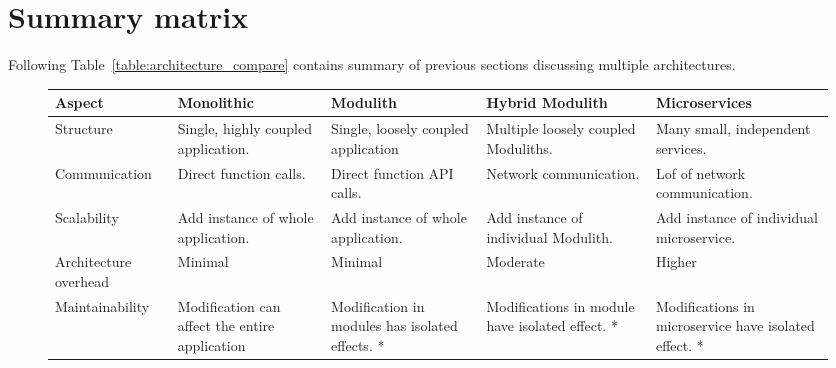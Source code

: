 \section{Summary matrix}
Following Table~\ref{table:architecture_compare} contains summary of previous sections discussing multiple architectures.


\begin{sidewaysfigure}
    \begin{tabular}{ |p{2.7cm}|p{3cm}|p{3cm}|p{4cm}|p{3cm}| }
        \hline
        \textbf{Aspect}       & \textbf{Monolithic}                            & \textbf{Modulith}                                 & \textbf{Hybrid Modulith}                                                            & \textbf{Microservices}                                                                        \\
        \hline
        Structure             & Single, highly coupled   application.          & Single, loosely coupled application               & Multiple loosely coupled Moduliths.                                                 & Many small, independent services.                                                             \\
        \hline
        Communication         & Direct function calls.                         & Direct function API calls.                        & Network communication.                                                              & Lof of network communication.                                                                 \\
        \hline
        Scalability           & Add instance of whole application.             & Add instance of whole application.                & Add instance of individual Modulith.                                                & Add instance of individual microservice.                                                      \\
        \hline
        Architecture overhead & Minimal                                        & Minimal                                           & Moderate                                                                            & Higher                                                                                        \\
        \hline
        Maintainability       & Modification can affect the entire application & Modification in modules has isolated effects. *   & Modifications in module have isolated effect. *                                     & Modifications in microservice have isolated effect. *                                         \\

\end{tabular}
\end{sidewaysfigure}
